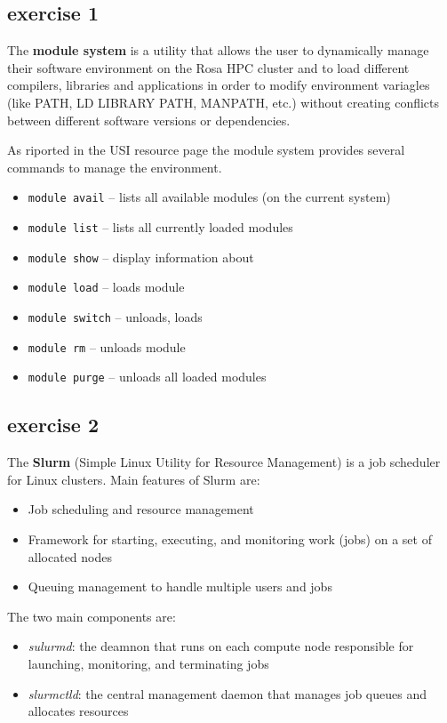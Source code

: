 \subsection{exercise 1}
The \textbf{module system} is a utility that allows the user to dynamically manage their software environment on the Rosa HPC cluster and to load different compilers, libraries and applications in order to modify environment variagles (like PATH, LD LIBRARY PATH, MANPATH, etc.) without creating conflicts between different software versions or dependencies.    

As riported in the USI resource page the module system provides several commands to manage the environment.

\begin{itemize}
    \item \texttt{module avail} -- lists all available modules (on the current system)
    \item \texttt{module list} -- lists all currently loaded modules
    \item \texttt{module show} -- display information about
    \item \texttt{module load} -- loads module
    \item \texttt{module switch} -- unloads, loads
    \item \texttt{module rm} -- unloads module
    \item \texttt{module purge} -- unloads all loaded modules
\end{itemize}

\subsection{exercise 2}
The \textbf{Slurm} (Simple Linux Utility for Resource Management) is a job scheduler for Linux clusters.
Main features of Slurm are:
\begin{itemize}
    \item Job scheduling and resource management
    \item Framework for starting, executing, and monitoring work (jobs) on a set of allocated nodes
    \item Queuing management to handle multiple users and jobs
\end{itemize}

The two main components are:
\begin{itemize}
    \item \textit{sulurmd}: the deamnon that runs on each compute node responsible for launching, monitoring, and terminating jobs
    \item \textit{slurmctld}: the central management daemon that manages job queues and allocates resources
\end{itemize}

